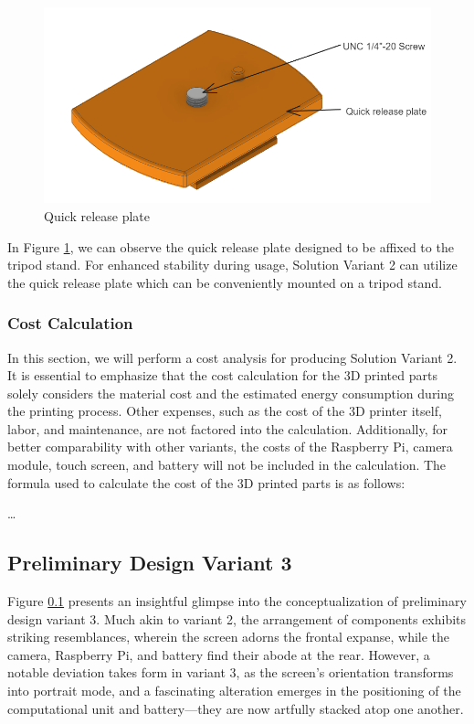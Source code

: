 \begin{figure}[ht!]
    \centering
    \includegraphics[height=5 cm]{texs/Part1/chapter4/image/v29.png}
    \caption{Quick release plate}
    \label{fig:variant2_quick_release_plate}
\end{figure}

In Figure \ref{fig:variant2_quick_release_plate}, we can observe the quick release plate designed to be affixed to the tripod stand. For enhanced stability during usage, Solution Variant 2 can utilize the quick release plate which can be conveniently mounted on a tripod stand.

\subsubsection{Cost Calculation}
In this section, we will perform a cost analysis for producing Solution Variant 2. It is essential to emphasize that the cost calculation for the 3D printed parts solely considers the material cost and the estimated energy consumption during the printing process. Other expenses, such as the cost of the 3D printer itself, labor, and maintenance, are not factored into the calculation. Additionally, for better comparability with other variants, the costs of the Raspberry Pi, camera module, touch screen, and battery will not be included in the calculation. The formula used to calculate the cost of the 3D printed parts is as follows:

\dots


\subsection{Preliminary Design Variant 3}


Figure \ref{} presents an insightful glimpse into the conceptualization of preliminary design variant 3. Much akin to variant 2, the arrangement of components exhibits striking resemblances, wherein the screen adorns the frontal expanse, while the camera, Raspberry Pi, and battery find their abode at the rear. However, a notable deviation takes form in variant 3, as the screen's orientation transforms into portrait mode, and a fascinating alteration emerges in the positioning of the computational unit and battery—they are now artfully stacked atop one another.

